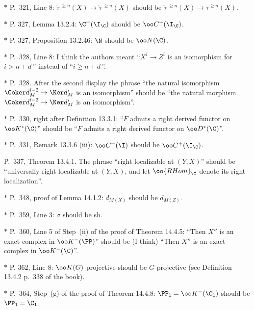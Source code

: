 \documentclass[12pt]{article}
\theoremstyle{remark}
\theoremstyle{definition}
\begin{document}
\nn$*$ P.~321, Line 8: $\widetilde\tau\,{}^{\ge n}(X)\to\widetilde\tau\,{}^{\ge n}(X)$ should be $\widetilde\tau\,{}^{\ge n}(X)\to\tau^{\ge n}(X)$.

\nn$*$ P. 327, Lemma 13.2.4: $\C^+(\I_\C)$ should be $\oo C^+(\I_\C)$.

\nn$*$ P. 327, Proposition 13.2.46: $\N$ should be $\oo N(\C)$.

\nn$*$ P.~328, Line 8: I think the authors meant ``$X^i\to Z^i$ is an isomorphism for $i>n+d\,$'' instead of ``$i\ge n+d\,$''.

\nn$*$ P.~328. After the second display the phrase ``the natural isomorphism $\Coker d_M^{i-2}\to\Ker d_M^i$ is an isomorphism'' should be ``the natural morphism $\Coker d_M^{i-2}\to\Ker d_M^i$ is an isomorphism''.

\nn$*$ P.~330, right after Definition 13.3.1: ``$F$ admits a right derived functor on $\oo K^*(\C)$'' should be ``$F$ admits a right derived functor on $\oo D^*(\C)$''.

\nn$*$ P.~331, Remark 13.3.6 (iii): $\oo C^+(\I)$ should be $\oo C^+(\I_\C)$.

\begin{s}
P.~337, Theorem 13.4.1. %
The phrase ``right localizable at $(Y,X)$'' should be ``universally right localizable at $(Y,X)$, and let $\oo{RHom}_\C$ denote its right localization''.
\end{s}

\nn$*$ P.~348, proof of Lemma 14.1.2: $d_{M(X)}$ should be $d_{M(Z)}$.

\nn$*$ P.~359, Line 3: $\sigma$ should be sh.


\nn$*$ P.~360, Line 5 of Step~(ii) of the proof of Theorem 14.4.5: ``Then $X''$ is an exact complex in $\oo K^-(\PP)$'' should be (I think) ``Then $X''$ is an exact complex in $\oo K^-(\C)$''.

\nn$*$ P. 362, Line 8: $\oo K(G)$-projective should be $G$-projective (see Definition 13.4.2 p.~338 of the book).

\nn$*$ P.~364, Step~(g) of the proof of Theorem 14.4.8: $\PP_1=\oo K^-(\C_1)$ should be $\PP_1=\C_1$.
\end{document}
